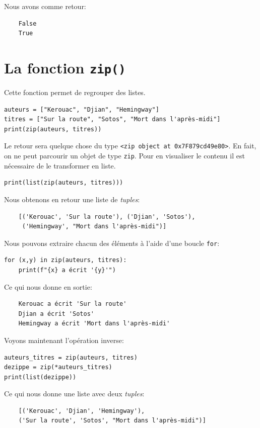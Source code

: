 \documentclass[a4paper,12pt]{book}
\begin{document}
Nous avons comme retour:
\begin{verbatim}
    False
    True
\end{verbatim}
\medskip

\section{La fonction \texttt{zip()}}
Cette fonction permet de regrouper des listes.
\begin{lstlisting}
auteurs = ["Kerouac", "Djian", "Hemingway"]
titres = ["Sur la route", "Sotos", "Mort dans l'après-midi"]
print(zip(auteurs, titres))
\end{lstlisting}
\medskip

Le retour sera quelque chose du type \texttt{<zip object at 0x7F879cd49e80>}. En fait, on ne peut parcourir un objet de type \texttt{zip}. Pour en visualiser le contenu il est nécessaire de le transformer en liste.
\begin{lstlisting}
print(list(zip(auteurs, titres)))
\end{lstlisting}
\medskip

Nous obtenons en retour une liste de \textit{tuples}:
\begin{verbatim}
    [('Kerouac', 'Sur la route'), ('Djian', 'Sotos'),
     ('Hemingway', "Mort dans l'après-midi")]
\end{verbatim}
\medskip

Nous pouvons extraire chacun des éléments à l'aide d'une boucle \texttt{for}:
\begin{lstlisting}
for (x,y) in zip(auteurs, titres):
    print(f"{x} a écrit '{y}'")
\end{lstlisting}
\medskip

Ce qui nous donne en sortie:
\begin{verbatim}
    Kerouac a écrit 'Sur la route'
    Djian a écrit 'Sotos'
    Hemingway a écrit 'Mort dans l'après-midi'
\end{verbatim}
\medskip

Voyons maintenant l'opération inverse:
\begin{lstlisting}
auteurs_titres = zip(auteurs, titres)
dezippe = zip(*auteurs_titres)
print(list(dezippe))
\end{lstlisting}
\medskip

Ce qui nous donne une liste avec deux \textit{tuples}:
\begin{verbatim}
    [('Kerouac', 'Djian', 'Hemingway'), 
    ('Sur la route', 'Sotos', "Mort dans l'après-midi")]
\end{verbatim}
\medskip
\end{document}
